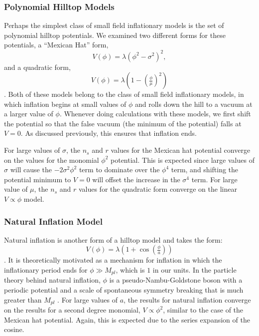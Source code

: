 \documentclass[a4paper,11pt]{article}
\begin{document}
\subsubsection{Polynomial Hilltop Models}
\label{sssec:Hilltop}
Perhaps the simplest class of small field inflationary models is the set of polynomial hilltop potentials. We examined two different forms for these potentials, a ``Mexican Hat'' form, 
\begin{equation}
V(\phi)=\lambda(\phi^2-\sigma^2)^2,
\end{equation} 
and a quadratic form, 
\begin{equation}
V(\phi)=\lambda(1-(\tfrac{\phi}{\mu})^2)
\end{equation} 
\citep{Boubekeur+Lyth2005}. Both of these models belong to the class of small field inflationary models, in which inflation begins at small values of $\phi$ and rolls down the hill to a vacuum at a larger value of $\phi$. Whenever doing calculations with these models, we first shift the potential so that the false vacuum (the minimum of the potential) falls at $V=0$. As discussed previously, this ensures that inflation ends. 

For large values of $\sigma$, the $n_s$ and $r$ values for the Mexican hat potential converge on the values for the monomial $\phi^2$ potential. This is expected since large values of $\sigma$ will cause the $-2\sigma^2\phi^2$ term to dominate over the $\phi^4$ term, and shifting the potential minimum to $V=0$ will offset the increase in the $\sigma^4$ term. For large value of $\mu$, the $n_s$ and $r$ values for the quadratic form converge on the linear $V\propto \phi$ model. 

\subsubsection{Natural Inflation Model}
Natural inflation is another form of a hilltop model and takes the form:
\begin{equation}
V(\phi)=\lambda(1+\cos(\tfrac{\phi}{a}))
\end{equation}
\citep{Adams+1993}. It is theoretically motivated as a mechanism for inflation in which the inflationary period ends for $\phi\gg M_{pl}$, which is $1$ in our units. In the particle theory behind natural inflation, $\phi$ is a pseudo-Nambu-Goldstone boson with a periodic potential and a scale of spontaneous symmetry breaking that is much greater than $M_{pl}$ \citep{Boubekeur+Lyth2005}. For large values of $a$, the results for natural inflation converge on the results for a second degree monomial, $V\propto\phi^2$, similar to the case of the Mexican hat potential. Again, this is expected due to the series expansion of the cosine. 
\end{document}
